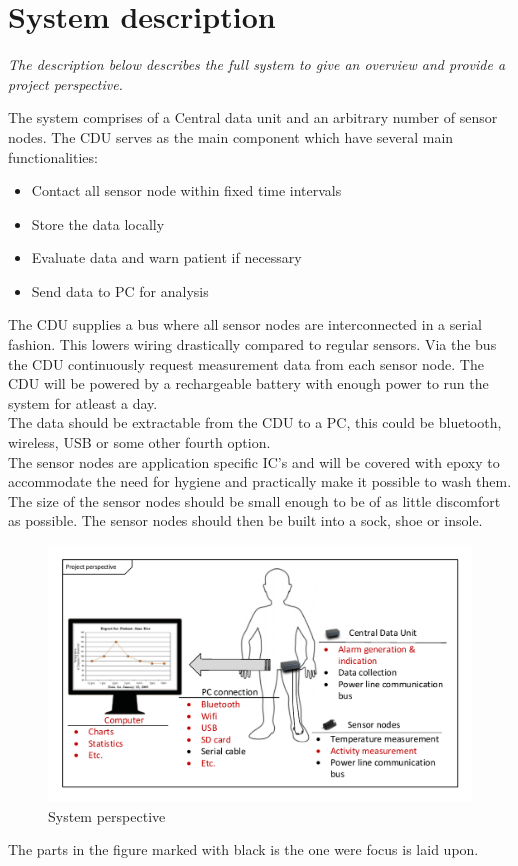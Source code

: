 \chapter{System description}

\textit{The description below describes the full system to give an overview and provide a project perspective.}

The system comprises of a Central data unit and an arbitrary number of sensor nodes. The CDU serves as the main component which have several main functionalities:
\begin{itemize}
	\item Contact all sensor node within fixed time intervals
	\item Store the data locally
	\item Evaluate data and warn patient if necessary
	\item Send data to PC for analysis
\end{itemize}
The CDU supplies a bus where all sensor nodes are interconnected in a serial fashion. This lowers wiring drastically compared to regular sensors.
Via the bus the CDU continuously request measurement data from each sensor node. The CDU will be powered by a rechargeable battery with enough power to run the system for atleast a day.\\
The data should be extractable from the CDU to a PC, this could be bluetooth, wireless, USB or some other fourth option.\\

The sensor nodes are application specific IC's and will be covered with epoxy to accommodate the need for hygiene and practically make it possible to wash them. The size of the sensor nodes should be small enough to be of as little discomfort as possible. The sensor nodes should then be built into a sock, shoe or insole.


\begin{figure}[H]
	\centering
	\includegraphics[width=.7\textwidth]{billeder/6Systemdescription/fullsystem_vector}
	\caption{System perspective}
	\label{fig:full_system}
\end{figure}

The parts in the figure marked with black is the one were focus is laid upon.

